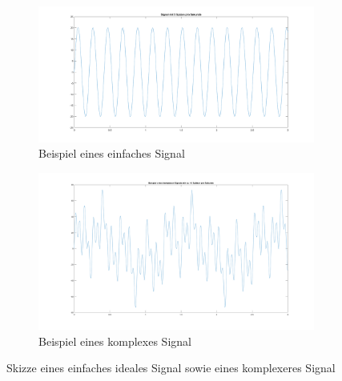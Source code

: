 \begin{figure}[H]
	\centering
	\begin{subfigure}{\textwidth}
		\centering
		\includegraphics[width=\textwidth]{Bilder/einfachesSignalBeispiel.png}
		\caption{Beispiel eines einfaches Signal}
		\label{fig:einfachesSignalBeispiel}
	\end{subfigure}
	\hfill
	\begin{subfigure}{\textwidth}
		\centering
		\includegraphics[width=\textwidth]{Bilder/komplexSignalBeispiel.png}
		\caption{Beispiel eines komplexes Signal}
		\label{fig:komplexSignalBeispiel}
	\end{subfigure}
	\caption{Skizze eines einfaches ideales Signal sowie eines komplexeres Signal}
	\label{fig:Skizze_IdealUndEchtSignal}
\end{figure}





